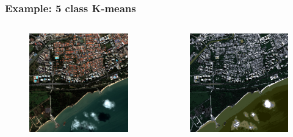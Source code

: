 \documentclass[compress]{beamer}
\begin{document}
\begin{frame}
\frametitle{Example: 5 class K-means }
\begin{columns}
\begin{column}{0.5\textwidth}
\begin{figure}[]
  \includegraphics[width=1.0\textwidth]{radio2-extract-3b.jpg}
\end{figure}
\end{column}
\begin{column}{0.5\textwidth}
\begin{figure}[]
  \includegraphics[width=1.0\textwidth]{kmeans-5-classes.png}
\end{figure}
\end{column}
\end{columns}
\end{frame}
\end{document}
